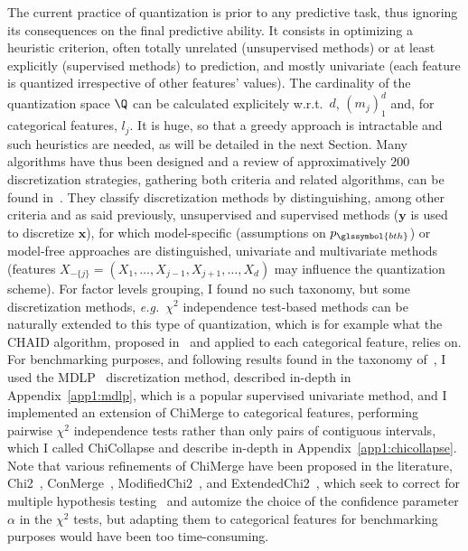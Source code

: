The current practice of quantization is prior to any predictive task, thus ignoring its consequences on the final predictive ability. It consists in optimizing a heuristic criterion, often totally unrelated (unsupervised methods) or at least explicitly (supervised methods) to prediction, and mostly univariate (each feature is quantized irrespective of other features' values). The cardinality of the quantization space $\Q$ can be calculated explicitely w.r.t.\ $d$, $(m_j)_1^d$ and, for categorical features, $l_j$. It is huge, so that a greedy approach is intractable and such heuristics are needed, as will be detailed in the next Section.
Many algorithms have thus been designed and a review of approximatively 200 discretization strategies, gathering both criteria and related algorithms, can be found in~\cite{ramirez2016data}. They classify discretization methods by distinguishing, among other criteria and as said previously, unsupervised and supervised methods ($\bm{y}$ is used to discretize $\bm{x}$), for which model-specific (assumptions on $p_{\glssymbol{bth}}$) or model-free approaches are distinguished, univariate and multivariate methods (features $X_{-\{j\}} = (X_{1},\ldots,X_{j-1},X_{j+1},\ldots,X_{d})$ may influence the quantization scheme). For factor levels grouping, I found no such taxonomy, but some discretization methods, \textit{e.g.}\ $\chi^2$ independence test-based methods can be naturally extended to this type of quantization, which is for example what the CHAID algorithm, proposed in~\cite{kass1980exploratory} and applied to each categorical feature, relies on.
For benchmarking purposes, and following results found in the taxonomy of~\cite{ramirez2016data}, I used the MDLP~\cite{fayyad1993multi} discretization method, described in-depth in Appendix~\ref{app1:mdlp}, which is a popular supervised univariate method, and I implemented an extension of ChiMerge to categorical features, performing pairwise $\chi^2$ independence tests rather than only pairs of contiguous intervals, which I called ChiCollapse and describe in-depth in Appendix~\ref{app1:chicollapse}. Note that various refinements of ChiMerge have been proposed in the literature, Chi2~\cite{liu1995chi2}, ConMerge~\cite{wang1998concurrent}, ModifiedChi2~\cite{tay2002modified}, and ExtendedChi2~\cite{su2005extended}, which seek to correct for multiple hypothesis testing~\cite{shaffer1995multiple} and automize the choice of the confidence parameter $\alpha$ in the $\chi^2$ tests, but adapting them to categorical features for benchmarking purposes would have been too time-consuming.


